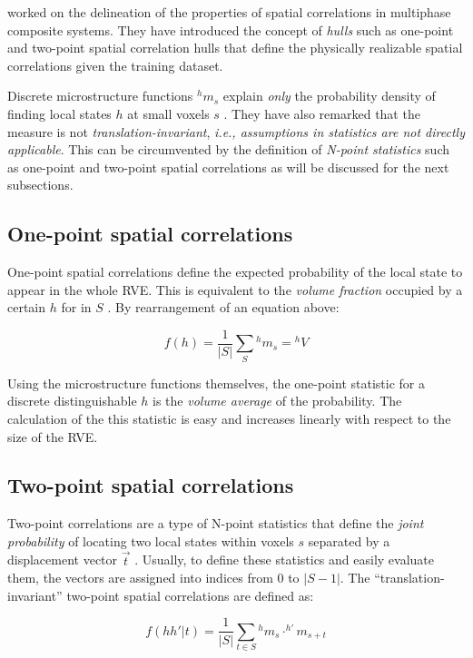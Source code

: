  worked on the delineation of the properties of spatial correlations in multiphase composite systems.
They have introduced the concept of \emph{hulls} such as one-point and two-point spatial correlation hulls that define the physically realizable spatial correlations given the training dataset.

Discrete microstructure functions $^hm_s$ explain \emph{only} the probability density of finding local states $h$ at small voxels $s$ \cite{polar}.
They have also remarked that the measure is not \textit{translation-invariant}, \textit{i.e., assumptions in statistics are not directly applicable}.
This can be circumvented by the definition of \emph{N-point statistics} such as one-point and two-point spatial correlations as will be discussed for the next subsections.

\subsection{One-point spatial correlations}

One-point spatial correlations define the expected probability of the local state to appear in the whole RVE.
This is equivalent to the \emph{volume fraction} occupied by a certain $h$ for in $S$ \cite{delin}.
By rearrangement of an equation above:

\[
  f(h) = \dfrac{1}{\lvert S\rvert} \sum_{S} {^hm_s} = {^hV}
\]

Using the microstructure functions themselves, the one-point statistic for a discrete distinguishable $h$ is the \emph{volume average} of the probability.
The calculation of the this statistic is easy and increases linearly with respect to the size of the RVE.

\subsection{Two-point spatial correlations}

Two-point correlations are a type of N-point statistics that define the \emph{joint probability} of locating two local states within voxels $s$ separated by a displacement vector $\vec{t}$ \cite{delin}.
Usually, to define these statistics and easily evaluate them, the vectors are assigned into indices from $0$ to $\lvert S-1\rvert$.
The ``translation-invariant'' two-point spatial correlations are defined as:

\[
  f(hh'\lvert t) = \dfrac{1}{\lvert S\rvert}\sum_{t \in S} {^hm_s} \cdot ^{h'}m_{s+t}
\]

